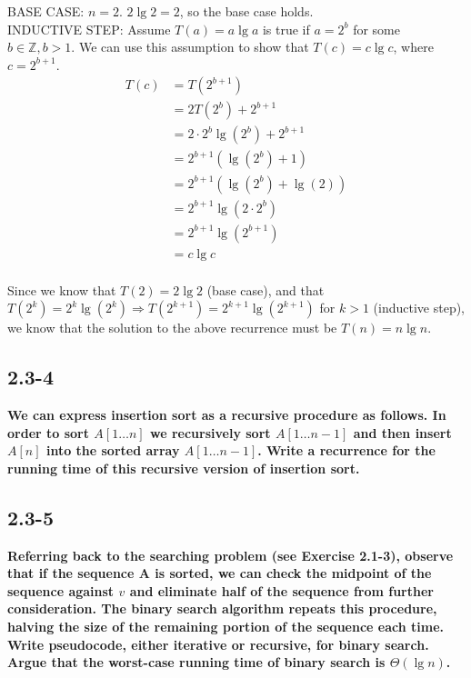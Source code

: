 \documentclass[11pt]{article}
\begin{document}
 BASE CASE: $n = 2$.  $2 \lg 2 = 2$, so the base case holds. \\

 INDUCTIVE STEP: Assume $T(a) = a \lg a$ is true if $a = 2^b$ for some $b \in \mathbb{Z}, b > 1$. 
 We can use this assumption to show that $T(c) = c \lg c$, where $c = 2^{b+1}$.
 \begin{align*}
   && T(c) &= T(2^{b+1}) && \\
   && &= 2T(2^b) + 2^{b+1} && \\
   && &= 2 \cdot 2^b \lg (2^b) + 2^{b+1} && \\
   && &= 2^{b+1}(\lg(2^b) + 1) && \\
   && &= 2^{b+1}(\lg(2^b) + \lg(2)) && \\
   && &= 2^{b+1}\lg(2 \cdot 2^b) && \\
   && &= 2^{b+1}\lg(2^{b+1}) && \\
   && &= c \lg c && \\
 \end{align*}

 Since we know that $T(2) = 2 \lg 2$ (base case), and that $T(2^k) = 2^k \lg (2^k) \Rightarrow
 T(2^{k+1}) = 2^{k+1} \lg (2^{k+1})$ for $k > 1$ (inductive step), we know that the solution 
 to the above recurrence must be $T(n) = n \lg n$. \newpage

 \subsection*{2.3-4}
 \textbf{We can express insertion sort as a recursive procedure as follows. In order to sort 
 $A[1 \ldots n]$ we recursively sort $A[1 \ldots n-1]$ and then insert $A[n]$ into the sorted array 
 $A[1 \ldots n-1]$. Write a recurrence for the running time of this recursive version of insertion 
 sort.}

 \subsection*{2.3-5}
 \textbf{Referring back to the searching problem (see Exercise 2.1-3), observe that if the sequence 
 A is sorted, we can check the midpoint of the sequence against $v$ and eliminate half of the sequence 
 from further consideration. The binary search algorithm repeats this procedure, halving the size of 
 the remaining portion of the sequence each time. Write pseudocode, either iterative or recursive, 
 for binary search. Argue that the worst-case running time of binary search is $\Theta (\lg n)$.}
\end{document}
